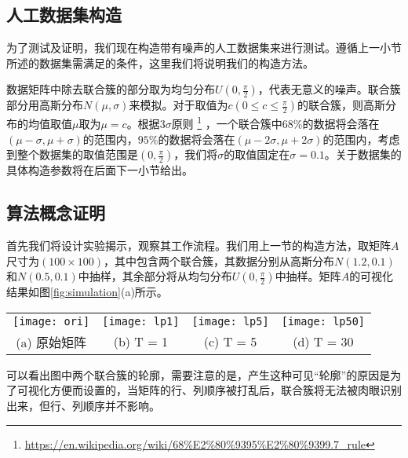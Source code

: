 \subsection{人工数据集构造}
\label{subsec:construct}
为了测试及证明，我们现在构造带有噪声的人工数据集来进行测试。遵循上一小节所述的数据集需满足的条件，这里我们将说明我们的构造方法。


数据矩阵中除去联合簇的部分取为均匀分布$U(0,\frac{\pi}{2})$，代表无意义的噪声。联合簇部分用高斯分布$N(\mu,\sigma)$来模拟。对于取值为$c(0\le{}c\le\frac{\pi}{2})$的联合簇，则高斯分布的均值取值$\mu$取为$\mu=c$。根据$3\sigma$原则
\footnote{\url{https://en.wikipedia.org/wiki/68\%E2\%80\%9395\%E2\%80\%9399.7_rule}}
，一个联合簇中$68\%$的数据将会落在$(\mu-\sigma,\mu+\sigma)$的范围内，$95\%$的数据将会落在$(\mu-2\sigma,\mu+2\sigma)$的范围内，考虑到整个数据集的取值范围是$(0,\frac{\pi}{2})$，我们将$\sigma$的取值固定在$\sigma=0.1$。关于数据集的具体构造参数将在后面下一小节给出。

\subsection{算法概念证明}
\label{subsec:artificial}
首先我们将设计实验揭示，观察其工作流程。我们用上一节的构造方法，取矩阵$A$尺寸为$(100\times100)$，其中包含两个联合簇，其数据分别从高斯分布$N(1.2,0.1)$和$N(0.5,0.1)$中抽样，其余部分将从均匀分布$U(0,\frac{\pi}{2})$中抽样。矩阵$A$的可视化结果如图\ref{fig:simulation}(a)所示。

\vspace{2mm}
\tabcolsep=1pt
\begin{figure*}[!htb]
\centering
\begin{tabular}{cccc}
\texttt{[image: ori]}&
\texttt{[image: lp1]}&
\texttt{[image: lp5]}&
\texttt{[image: lp50]}\\
(a) 原始矩阵 & (b) T = 1 & (c) T = 5 & (d) T = 30
\end{tabular}
\caption{。 (a)原始矩阵及包含在其中的两个联合簇。(b)-(c)动态交互在的过程，可以看出联合簇中的值随着时间渐渐同步。(d)算法收敛的同步矩阵，可以看到两个嵌入的聚类簇被完美地发掘出来。}
\label{fig:simulation}
\end{figure*}

可以看出图中两个联合簇的轮廓，需要注意的是，产生这种可见“轮廓”的原因是为了可视化方便而设置的，当矩阵的行、列顺序被打乱后，联合簇将无法被肉眼识别出来，但行、列顺序并不影响。

